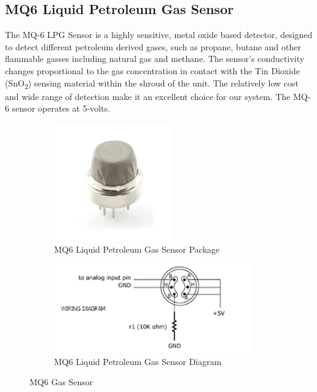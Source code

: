 \subsection{MQ6 Liquid Petroleum Gas Sensor}
\par The MQ-6 LPG Sensor is a highly sensitive, metal oxide based detector, designed to detect different petroleum derived gases, such as propane, butane and other flammable gasses including natural gas and methane. The sensor's conductivity changes proportional to the gas concentration in contact with the Tin Dioxide (SnO\textsubscript{2}) sensing material within the shroud of the unit. The relatively low cost and wide range of detection make it an excellent choice for our system. The MQ-6 sensor operates at 5-volts.
\begin{figure}[h!]
	\centering
	\begin{subfigure}[t]{0.45\textwidth}
		\centering
		\includegraphics[height = 2in]{mq6.png}
		\caption{MQ6 Liquid Petroleum Gas Sensor Package}
	\end{subfigure}
	\begin{subfigure}[t]{0.45\textwidth}
		\centering
		\includegraphics[height = 1.5in]{mq6diag.png}
		\caption{MQ6 Liquid Petroleum Gas Sensor Diagram}
	\end{subfigure}
	\caption{MQ6 Gas Sensor}
\end{figure}
